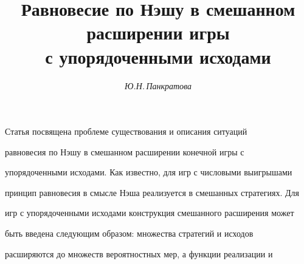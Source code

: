 

\setcounter{page}{34} 












 


\author{\it Ю.Н.\,Панкратова} 




\title{Равновесие по Нэшу в смешанном расширении игры\\ 


с упорядоченными исходами} 


 


\date{} 




\pagestyle{plain} %


 




\maketitle 


\label{begin} 


 


 


Статья посвящена проблеме существования и описания ситуаций 


равновесия по Нэшу в смешанном расширении конечной игры с 


упорядоченными исходами. Как известно, для игр с числовыми выигрышами 


принцип равновесия в смысле Нэша реализуется в смешанных стратегиях. Для 


игр с упорядоченными исходами конструкция смешанного расширения может 


быть введена следующим образом: множества стратегий и исходов 


расширяются до множеств вероятностных мер, а функции реализации и 


